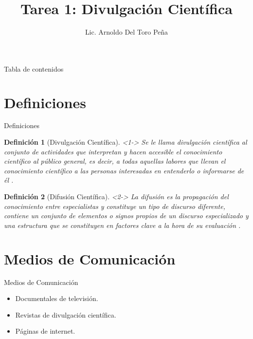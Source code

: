 \documentclass{beamer}
\title{Tarea 1: Divulgación Científica}
\author{Lic. Arnoldo Del Toro Peña }
\institute[UANL]{Universidad Autónoma de Nuevo León}
\newtheorem{definicion}{Definición}
\newcommand{\divul}{Divulgación Científica}
\newcommand{\difu}{Difusión Científica}
\begin{document}
	
	\begin{frame}
		\titlepage
	\end{frame}
	
	\begin{frame}{Tabla de contenidos}
		\tableofcontents
	\end{frame}
	
	\section{Definiciones}
	
	\begin{frame}{Definiciones}
		\begin{definicion}[\divul]<1->
			Se le llama divulgación científica al conjunto de actividades que interpretan y hacen accesible el conocimiento científico al público general, es decir, a todas aquellas labores que llevan el conocimiento científico a las personas interesadas en entenderlo o informarse de él  \citep{fundora_divulgacion_2021}.
		\end{definicion}
	
		\begin{definicion}[\difu]<2->
			La difusión es la propagación del conocimiento entre especialistas y constituye un tipo de discurso diferente, contiene un conjunto de elementos o signos propios de un discurso especializado y una estructura que se constituyen en factores clave a la hora de su evaluación \citep{espinosa_santos_difusion_2010}.
		\end{definicion}
	
	\end{frame} 
	
	\section{Medios de Comunicación}
	
	\begin{frame}{Medios de Comunicación}
		\begin{itemize}
			\item Documentales de televisión. \citep{inti_cine_2021}
			\item Revistas de divulgación científica. \citep{diana_caracteristicas_2021}
			\item Páginas de internet. \citep{noauthor_investigacion_nodate}
		\end{itemize}
	\end{frame}
	
\end{document}
